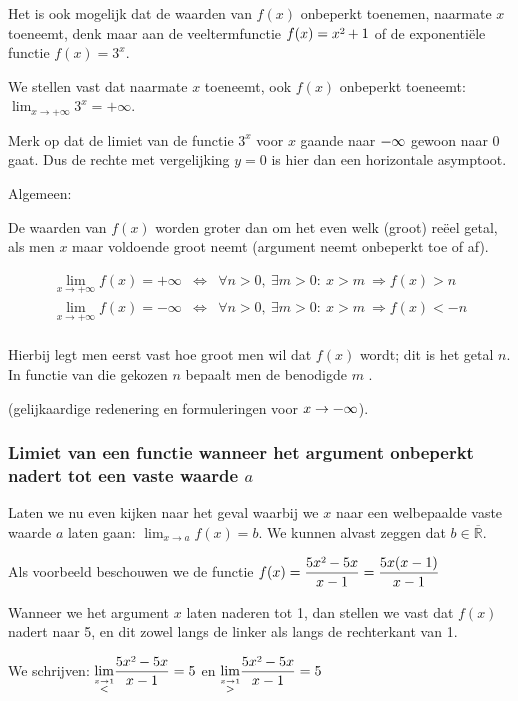 Het is ook mogelijk dat de waarden van $f(x)$ onbeperkt
toenemen, naarmate $x$ toeneemt, denk maar aan de veeltermfunctie
$f(x)=x\text{\texttwosuperior}+1$ of de exponenti\"ele functie $f(x)=3^{x}$.

We stellen vast dat naarmate $x$ toeneemt, ook $f(x)$
onbeperkt toeneemt: $ \lim_{x\to+\infty}3^{x}=+\infty$. 

Merk op dat de limiet van de functie $3^{x}$ voor $x$
gaande naar $\text{\textminus\ensuremath{\infty}}$ gewoon naar $0$
gaat. Dus de rechte met vergelijking $y=0$ is hier dan een horizontale
asymptoot.


Algemeen:

De waarden van $f(x)$ worden groter dan om het even welk (groot)
re\"eel getal, als men $x$ maar voldoende groot neemt (argument neemt
onbeperkt toe of af).

\begin{eqnarray*}
 \lim_{x\to+\infty}f(x)=+\infty & \Leftrightarrow & \forall n>0,\:\exists m>0:\:x>m\:\Rightarrow f(x)>n\\
 \lim_{x\to+\infty}f(x)=-\infty & \Leftrightarrow & \forall n>0,\:\exists m>0:\:x>m\:\Rightarrow f(x)<-n\\
\end{eqnarray*} 

Hierbij legt men eerst vast hoe groot men wil dat $f(x)$ wordt; dit
is het getal $n$. In functie van die gekozen $n$ bepaalt men de
benodigde $m$ .

(gelijkaardige redenering en formuleringen voor $x\rightarrow\text{\textminus\ensuremath{\infty}}$).


\subsubsection{Limiet van een functie wanneer het argument onbeperkt nadert tot
een vaste waarde $a$}

Laten we nu even kijken naar het geval waarbij we $x$ naar een welbepaalde
vaste waarde $a$ laten gaan: ${\displaystyle \lim_{x\to a}}f(x)=b$.
We kunnen alvast zeggen dat $b\in\overline{\mathbb{R}}$.

\begin{voorbeeld}
	Als voorbeeld beschouwen we de functie $f(x)={\displaystyle \frac{5x\text{\texttwosuperior}-5x}{x-1}}={\displaystyle \frac{5x(x-1)}{x-1}}$ 


Wanneer we het argument $x$ laten naderen tot 1, dan stellen
we vast dat $f(x)$ nadert naar 5, en dit zowel langs de linker als
langs de rechterkant van 1.

We schrijven: ${\displaystyle \lim_{\overset{x\rightarrow1}{<}}}{\displaystyle \frac{5x\text{\texttwosuperior}-5x}{x-1}}=5$
en ${\displaystyle \lim_{\overset{x\rightarrow1}{>}}}{\displaystyle \frac{5x\text{\texttwosuperior}-5x}{x-1}}=5$ 

\end{voorbeeld}

